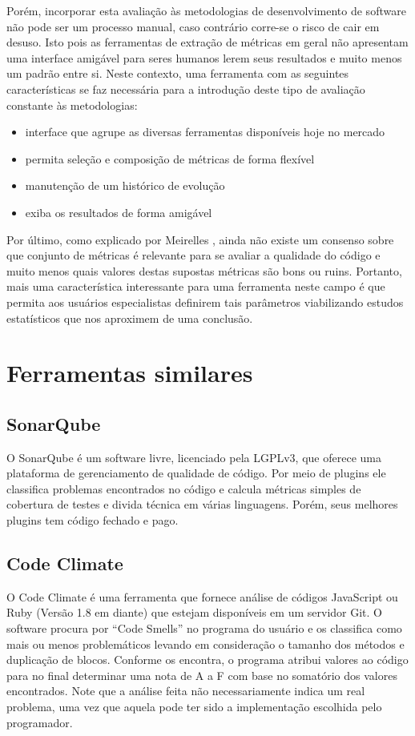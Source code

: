\documentclass[10pt]{article}
\begin{document}
Porém, incorporar esta avaliação às metodologias de desenvolvimento de software não pode ser um processo manual, caso contrário corre-se o risco de cair em desuso. Isto pois as ferramentas de extração de métricas em geral não apresentam uma interface amigável para seres humanos lerem seus resultados e muito menos um padrão entre si.
Neste contexto, uma ferramenta com as seguintes características se faz necessária para a introdução deste tipo de avaliação constante às metodologias:
\begin{itemize}
  \item interface que agrupe as diversas ferramentas disponíveis hoje no mercado
  \item permita seleção e composição de métricas de forma flexível
  \item manutenção de um histórico de evolução
  \item exiba os resultados de forma amigável
\end{itemize}
Por último, como explicado por Meirelles \cite{m13}, ainda não existe um consenso sobre que conjunto de métricas é relevante para se avaliar a qualidade do código e muito menos quais valores destas supostas métricas são bons ou ruins. Portanto, mais uma característica interessante para uma ferramenta neste campo é que permita aos usuários especialistas definirem tais parâmetros viabilizando estudos estatísticos que nos aproximem de uma conclusão.
\section{Ferramentas similares}
  \subsection{SonarQube}
  O SonarQube é um software livre, licenciado pela LGPLv3, que oferece uma plataforma de gerenciamento de qualidade de código. Por meio de plugins ele classifica problemas encontrados no código e calcula métricas simples de cobertura de testes e divida técnica em várias linguagens. Porém, seus melhores plugins tem código fechado e pago.
  \subsection{Code Climate}
  O Code Climate é uma ferramenta que fornece análise de códigos JavaScript ou Ruby (Versão 1.8 em diante) que estejam disponíveis em um servidor Git.
  O software procura por ``Code Smells'' no programa do usuário e os classifica como mais ou menos problemáticos levando em consideração o tamanho dos métodos e duplicação de blocos. Conforme os encontra, o programa atribui valores ao código para no final determinar uma nota de A a F com base no somatório dos valores encontrados. Note que a análise feita não necessariamente indica um real problema, uma vez que aquela pode ter sido a implementação escolhida pelo programador.
\end{document}
